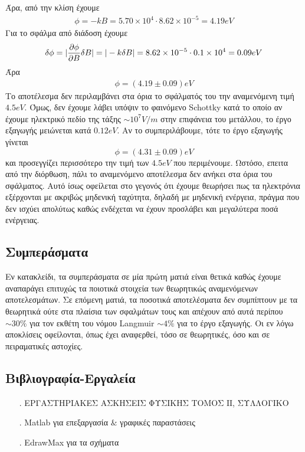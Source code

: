 \documentclass[a4paper]{article}
\begin{document}
Άρα, από την κλίση έχουμε 
\vspace{-0.1in}
\begin{align*}
\phi =-k B = 5.70\times10^4\cdot 8.62\times10^{-5}=4.19eV
\end{align*}
Για το σφάλμα από διάδοση έχουμε 
\begin{align*}
\delta\phi = | \pdv{\phi}{B}\delta B |=|-k\delta B|=8.62\times10^{-5}\cdot 0.1\times10^{4} = 0.09eV
\end{align*}
Άρα 
\vspace{-0.2in}
\begin{align*}
\phi = (4.19\pm0.09)eV 
\end{align*}
Το αποτέλεσμα δεν περιλαμβάνει στα όρια το σφάλματός του την αναμενόμενη τιμή $4.5eV$.
Όμως, δεν έχουμε λάβει υπόψιν το φαινόμενο Schottky κατά το οποίο αν έχουμε ηλεκτρικό πεδίο της τάξης $\sim10^7V/m$ στην επιφάνεια του μετάλλου, το έργο εξαγωγής μειώνεται κατά $0.12eV$. Αν το συμπεριλάβουμε, τότε το έργο εξαγωγής γίνεται $$\phi=(4.31\pm0.09)eV$$ και προσεγγίζει περισσότερο την τιμή των $4.5eV$ που περιμένουμε.
Ωστόσο, επειτα από την διόρθωση, πάλι το αναμενόμενο αποτέλεσμα δεν ανήκει στα όρια του σφάλματος.
Αυτό ίσως οφείλεται στο γεγονός ότι έχουμε θεωρήσει πως τα ηλεκτρόνια εξέρχονται με ακριβώς μηδενική ταχύτητα, δηλαδή με μηδενική ενέργεια, πράγμα που δεν ισχύει απολύτως καθώς ενδέχεται να έχουν προσλάβει και μεγαλύτερα ποσά ενέργειας.


\subsection*{Συμπεράσματα}
Εν κατακλείδι, τα συμπεράσματα σε μία πρώτη ματιά είναι θετικά καθώς έχουμε αναπαράγει επιτυχώς τα ποιοτικά στοιχεία των θεωρητικώς αναμενόμενων αποτελεσμάτων. Σε επόμενη ματιά, τα ποσοτικά αποτελέσματα δεν συμπίπτουν με τα θεωρητικά ούτε στα πλαίσια των σφαλμάτων τους και απέχουν από αυτά περίπου $\sim30\%$ για τον εκθέτη του νόμου Langmuir $\sim4\%$ για το έργο εξαγωγής. Οι εν λόγω αποκλίσεις οφείλονται, όπως έχει αναφερθεί, τόσο σε θεωρητικές, όσο και σε πειραματικές αστοχίες. 

\subsection*{Βιβλιογραφία-Εργαλεία}
\begin{itemize}
\item[.] ΕΡΓΑΣΤΗΡΙΑΚΕΣ ΑΣΚΗΣΕΙΣ ΦΥΣΙΚΗΣ ΤΟΜΟΣ ΙΙ, ΣΥΛΛΟΓΙΚΟ
\item[.] Matlab για επεξαργασία $\&$ γραφικές παραστάσεις
\item[.] EdrawMax για τα σχήματα
\end{itemize}
\end{document}
